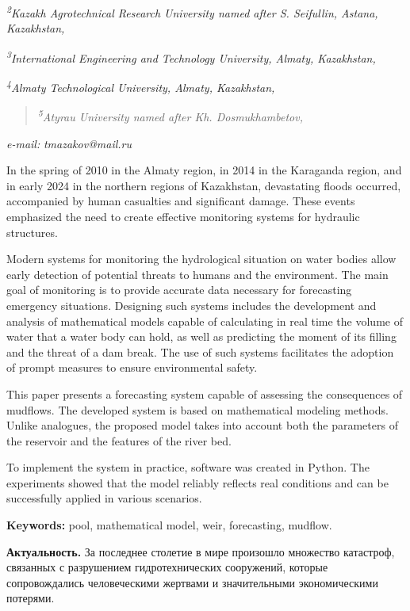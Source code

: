 \documentclass[
]{article}
\begin{document}
\emph{\textsuperscript{2}Kazakh Agrotechnical Research University named
after S. Seifullin, Astana, Kazakhstan,}

\emph{\textsuperscript{3}International Engineering and Technology
University, Almaty, Kazakhstan,}

\emph{\textsuperscript{4}Almaty Technological University, Almaty,
Kazakhstan,}

\begin{quote}
\emph{\textsuperscript{5}Atyrau University named after Kh.
Dosmukhambetov,}
\end{quote}

\emph{e-mail:} \emph{tmazakov@mail.ru}

In the spring of 2010 in the Almaty region, in 2014 in the Karaganda
region, and in early 2024 in the northern regions of Kazakhstan,
devastating floods occurred, accompanied by human casualties and
significant damage. These events emphasized the need to create effective
monitoring systems for hydraulic structures.

Modern systems for monitoring the hydrological situation on water bodies
allow early detection of potential threats to humans and the
environment. The main goal of monitoring is to provide accurate data
necessary for forecasting emergency situations. Designing such systems
includes the development and analysis of mathematical models capable of
calculating in real time the volume of water that a water body can hold,
as well as predicting the moment of its filling and the threat of a dam
break. The use of such systems facilitates the adoption of prompt
measures to ensure environmental safety.

This paper presents a forecasting system capable of assessing the
consequences of mudflows. The developed system is based on mathematical
modeling methods. Unlike analogues, the proposed model takes into
account both the parameters of the reservoir and the features of the
river bed.

To implement the system in practice, software was created in Python. The
experiments showed that the model reliably reflects real conditions and
can be successfully applied in various scenarios.

\textbf{Keywords:} pool, mathematical model, weir, forecasting, mudflow.

\textbf{Актуальность.} За последнее столетие в мире произошло множество
катастроф, связанных с разрушением гидротехнических сооружений, которые
сопровождались человеческими жертвами и значительными экономическими
потерями.
\end{document}
